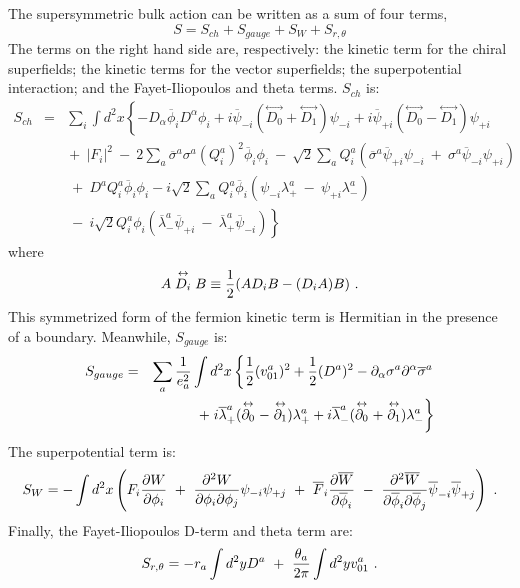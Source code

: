 \documentclass[a4paper,12pt]{article}
\begin{document}
The supersymmetric bulk action can be written as a sum of four terms, 
\begin{equation}
S=S_{ch}+S_{gauge}+S_{W}+S_{r,\theta}
\label{bulkaction}
\end{equation}
The terms on the right hand side are, respectively: the kinetic term for
the chiral superfields; the kinetic terms for the vector superfields; the
superpotential interaction; and the Fayet-Iliopoulos and theta terms. 
$S_{ch}$ is: 
\begin{eqnarray}
S_{ch}&=&\sum_i\int d^2x \left\{ 
- D_{\alpha}\overline{\phi}_i D^{\alpha} \phi_i
+i \overline{\psi}_{-i}( \stackrel{\leftrightarrow}{D_0}
+\stackrel{\leftrightarrow}{D_1})\psi_{-i} \right.
+i \overline{\psi}_{+i}
( \stackrel{\leftrightarrow}{D_0}
-\stackrel{\leftrightarrow}{D_1})
\psi_{+i} \nonumber \\
& & \mbox{}+~|F_i|^2 ~-~2\sum_a\overline{\sigma}^a\sigma^a 
(Q_i^a)^2\overline{\phi}_i
\phi_i~-~\sqrt{2}\sum_a Q_i^a(\overline{\sigma}^a\overline{\psi}_{+i}\psi_{-i}~
+~\sigma^a
\overline{\psi}_{-i}\psi_{+i}) \nonumber \\ 
& & \mbox{}~+~D^aQ_i^a\overline{\phi}_i\phi_i 
-i\sqrt{2}\sum_aQ_i^a\overline{\phi}_i(\psi_{-i}
\lambda_+^a~-~\psi_{+i} \lambda_-^a) \nonumber\\
& & \left. \mbox{}~-~i \sqrt{2}Q_i^a\phi_i
(\overline{\lambda}_-^a
\overline{\psi}_{+i}~-~\overline{\lambda}_+^a\overline{\psi}_{-i} ) 
\right\}
\label{kechiral}
\end{eqnarray}
where
\begin{equation}
	A \stackrel{\leftrightarrow}{D_i} B \equiv 
	{1\over2} (A D_i B - (D_iA)B)\ .
\label{symder}
\end{equation}
This symmetrized form of the fermion kinetic term
is Hermitian in the presence of a boundary.
Meanwhile, $S_{gauge}$ is:
\begin{eqnarray}
S_{gauge}&=&\sum_a{1 \over e_a^2}\int d^2x\left\{{1 \over 2}(v_{01}^a)^2 + 
{1 \over 2}(D^a)^2 - \partial_{\alpha}\sigma^a \partial^{\alpha} 
\overline{\sigma}^a \right.  \nonumber \\
&&+  \left. i \overline{\lambda}_+^a
(\stackrel{\leftrightarrow}{\partial_0}-
\stackrel{\leftrightarrow}{\partial_1})
\lambda_+^a +i \overline{\lambda}_-^a
(\stackrel{\leftrightarrow}{\partial_0}+
\stackrel{\leftrightarrow}{\partial_1})
\lambda_-^a \right\}
\label{kevector}
\end{eqnarray}
The superpotential term is:
\begin{equation}
S_W=-\int d^2x \left( F_i {\partial W \over \partial
\phi_i}~+~{\partial^2 W \over \partial \phi_i\partial\phi_j} \psi_{-i}
\psi_{+j}~+~{\overline F}_i
{\partial \overline{W} \over \partial \overline{\phi}_i}~-~{\partial^2
\overline{W}
\over
\partial\overline{\phi}_i\partial\overline{\phi}_j}
\overline{\psi}_{-i}\overline{\psi}_{+j}
\right)\ .
\label{superpot}
\end{equation}
Finally, the Fayet-Iliopoulos D-term and theta term are:
\begin{equation}
S_{r, \theta}=-r_a\int d^2y D^a~+~{\theta_a\over 2 \pi} \int d^2 y
v_{01}^a\ .
\label{fid}
\end{equation}
\end{document}
